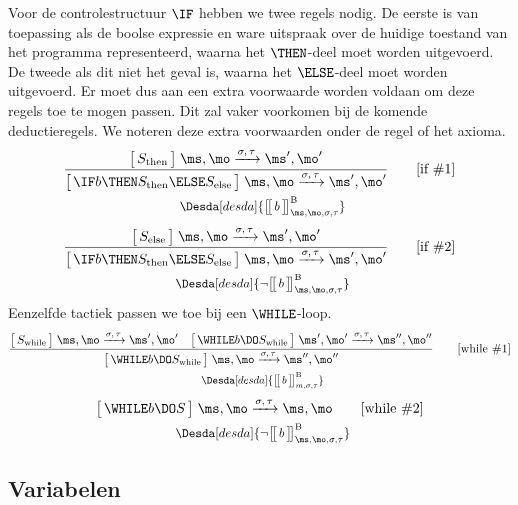 Voor de controlestructuur $\IF$ hebben we twee regels nodig. De eerste is van toepassing als de boolse expressie en ware uitspraak over de huidige toestand van het programma representeerd, waarna het $\THEN$-deel moet worden uitgevoerd. De tweede als dit niet het geval is, waarna het $\ELSE$-deel moet worden uitgevoerd. Er moet dus aan een extra voorwaarde worden voldaan om deze regels toe te mogen passen. Dit zal vaker voorkomen bij de komende deductieregels. We noteren deze extra voorwaarden onder de regel of het axioma.
%
\begin{gather*}
  \frac{
    \Terminates{S_\text{then}}
      {\ms, \mo}
      {\sigma, \tau}
      {\ms', \mo'}
  }{
    \Terminates{\IF b \THEN  S_\text{then} \ELSE S_\text{else} }
      {\ms, \mo}
      {\sigma, \tau}
      {\ms', \mo'}
  }
  \tag*{[if \#1]} \\
  \Desdas{
    \Desda[desda]{\Express[B]{b}{\ms, \mo,\sigma,\tau}}
  }
\end{gather*}
%
\begin{gather*}
  \frac{
    \Terminates{S_\text{else}}
      {\ms, \mo}
      {\sigma, \tau}
      {\ms', \mo'}
  }{
    \Terminates{\IF b \THEN  S_\text{then} \ELSE S_\text{else} }
      {\ms, \mo}
      {\sigma, \tau}
      {\ms', \mo'}
  }
  \tag*{[if \#2]} \\
  \Desdas{
    \Desda[desda]{\neg \Express[B]{b}{\ms, \mo,\sigma,\tau}}
  }
\end{gather*}
%
Eenzelfde tactiek passen we toe bij een $\WHILE$-loop.
%
\begin{gather*}
  \frac{
    \Terminates{S_\text{while}}
      {\ms, \mo}
      {\sigma, \tau}
      {\ms',\mo'}
  \quad
    \Terminates{\WHILE b \DO S_\text{while} }
      {\ms', \mo'}
      {\sigma, \tau}
      {\ms'',\mo''}
  }{
    \Terminates{\WHILE b \DO S_\text{while} }
      {\ms, \mo}
      {\sigma, \tau}
      {\ms'',\mo''}
  }
  \tag*{[while \#1]} \\
  \Desdas{
    \Desda[desda]{\Express[B]{b}{m,\sigma,\tau}}
  }
\end{gather*}
%
\begin{gather*}
  \Terminates{\WHILE b \DO S }
    {\ms, \mo}
    {\sigma, \tau}
    {\ms, \mo}
  \tag*{[while \#2]} \\
  \Desdas{
    \Desda[desda]{\neg \Express[B]{b}{\ms,\mo,\sigma,\tau}}
  }
\end{gather*}

\subsection{Variabelen}

